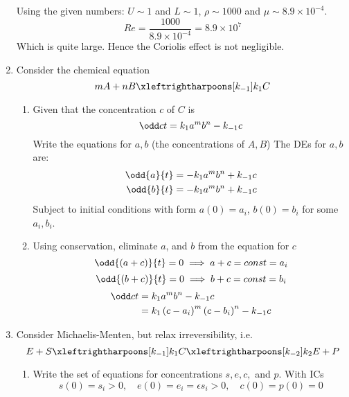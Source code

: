 \documentclass{X:/Documents/Coding/Latex/myassignment}
\begin{document}
\begin{enumerate}
	Using the given numbers: $U \sim 1$ and $L \sim 1$, $\rho \sim 1000$ and $\mu \sim 8.9\times 10^{-4}$.
	\[Re = \frac{1000}{8.9\times 10^{-4}} = 8.9\times 10^7\]
	Which is quite large. Hence the Coriolis effect is not negligible.



	\item Consider the chemical equation
	\[mA + nB \xleftrightharpoons[k_{-1}]{k_{1}} C \]
	\begin{enumerate}
		\item Given that the concentration $c$ of $C$ is
		\[\odd ct = k_1 a^m b^n - k_{-1} c\]
		Write the equations for $a,b$ (the concentrations of $A,B$)
		The DEs for $a,b$ are:
		\begin{align*}
			\odd{a}{t} &= -k_1a^mb^n + k_{-1}c\\
			\odd{b}{t} &= -k_1a^mb^n + k_{-1}c\\
		\end{align*}
		Subject to initial conditions with form $a(0) = a_i$, $b(0) = b_i$ for some $a_i,b_i$.
		\item Using conservation, eliminate $a$, and $b$ from the equation for $c$
		\[\odd{(a+c)}{t} = 0 \implies a + c = const = a_i\]
		\[\odd{(b+c)}{t} = 0 \implies b + c = const = b_i\]
		\begin{align*}
			\odd ct &=  k_1 a^m b^n - k_{-1} c\\
			&=  k_1 \left(c-a_i\right)^m \left(c-b_i\right)^n - k_{-1} c\\
		\end{align*}
	\end{enumerate}














	\item Consider Michaelis-Menten, but relax irreversibility, i.e.
	\[E + S \xleftrightharpoons[k_{-1}]{k_1} C \xleftrightharpoons[k_{-2}]{k_2} E + P\]
	\begin{enumerate}
		\item Write the set of equations for concentrations $s,e,c,$ and $p$. With ICs
		\[s(0) = s_i >0 ,\quad e(0) = e_i = \epsilon s_i > 0, \quad c(0) = p(0) = 0\]


\end{enumerate}
\end{enumerate}
\end{document}
